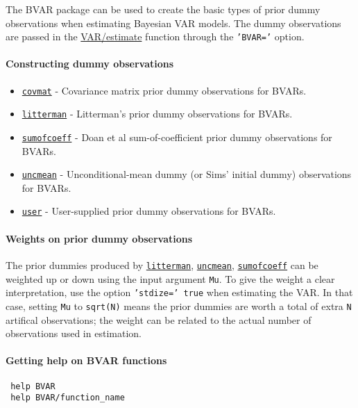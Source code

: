 

	The BVAR package can be used to create the basic types of prior dummy
 observations when estimating Bayesian VAR models. The dummy observations
 are passed in the \url{VAR/estimate} function through the
 \texttt{'BVAR='} option.
 
 \paragraph{Constructing dummy observations}
 
 \begin{itemize}
 \item
   \href{BVAR/covmat}{\texttt{covmat}} - Covariance matrix prior dummy
   observations for BVARs.
 \item
   \href{BVAR/litterman}{\texttt{litterman}} - Litterman's prior dummy
   observations for BVARs.
 \item
   \href{BVAR/sumofcoeff}{\texttt{sumofcoeff}} - Doan et al
   sum-of-coefficient prior dummy observations for BVARs.
 \item
   \href{BVAR/uncmean}{\texttt{uncmean}} - Unconditional-mean dummy (or
   Sims' initial dummy) observations for BVARs.
 \item
   \href{BVAR/user}{\texttt{user}} - User-supplied prior dummy
   observations for BVARs.
 \end{itemize}
 
 \paragraph{Weights on prior dummy observations}
 
 The prior dummies produced by \href{BVAR/litterman}{\texttt{litterman}},
 \href{BVAR/uncmean}{\texttt{uncmean}},
 \href{BVAR/sumofcoeff}{\texttt{sumofcoeff}} can be weighted up or down
 using the input argument \texttt{Mu}. To give the weight a clear
 interpretation, use the option \texttt{'stdize=' true} when estimating
 the VAR. In that case, setting \texttt{Mu} to \texttt{sqrt(N)} means the
 prior dummies are worth a total of extra \texttt{N} artifical
 observations; the weight can be related to the actual number of
 observations used in estimation.
 
 \paragraph{Getting help on BVAR functions}
 
 \begin{verbatim}
 help BVAR
 help BVAR/function_name
 \end{verbatim}




